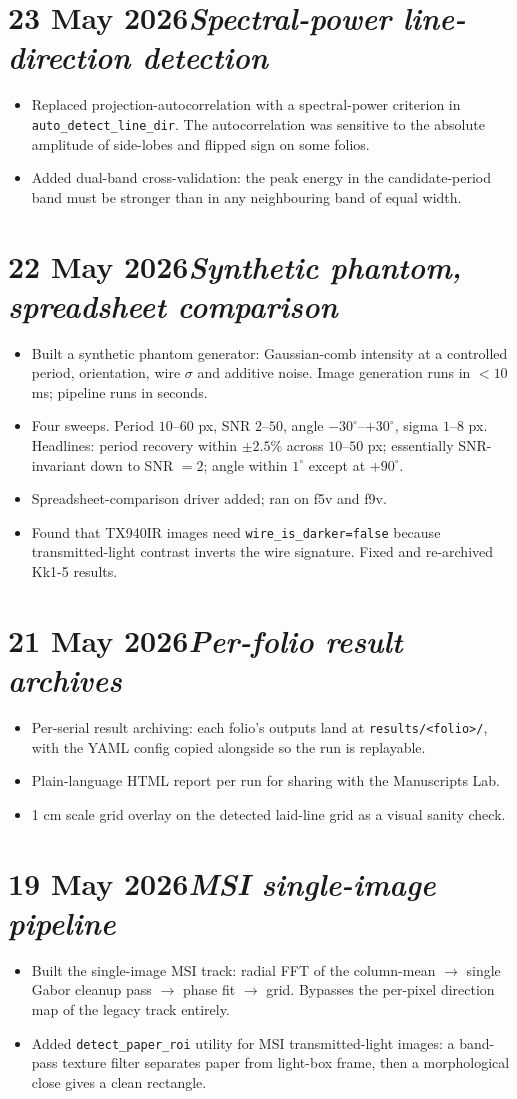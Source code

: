 \documentclass[11pt,a4paper]{article}
\newcommand{\logentry}[2]{\section*{#1\hfill\normalfont\normalsize\textit{#2}}}
\begin{document}
\logentry{23 May 2026}{Spectral-power line-direction detection}
\begin{itemize}
  \item Replaced projection-autocorrelation with a spectral-power criterion in \texttt{auto\_detect\_line\_dir}. The autocorrelation was sensitive to the absolute amplitude of side-lobes and flipped sign on some folios.
  \item Added dual-band cross-validation: the peak energy in the candidate-period band must be stronger than in any neighbouring band of equal width.
\end{itemize}

\logentry{22 May 2026}{Synthetic phantom, spreadsheet comparison}
\begin{itemize}
  \item Built a synthetic phantom generator: Gaussian-comb intensity at a controlled period, orientation, wire $\sigma$ and additive noise. Image generation runs in $<10$ ms; pipeline runs in seconds.
  \item Four sweeps. Period $10$--$60$ px, SNR $2$--$50$, angle $-30^\circ$--$+30^\circ$, sigma $1$--$8$ px. Headlines: period recovery within $\pm 2.5\%$ across $10$--$50$ px; essentially SNR-invariant down to SNR $= 2$; angle within $1^\circ$ except at $+90^\circ$.
  \item Spreadsheet-comparison driver added; ran on f5v and f9v.
  \item Found that TX940IR images need \texttt{wire\_is\_darker=false} because transmitted-light contrast inverts the wire signature. Fixed and re-archived Kk1-5 results.
\end{itemize}

\logentry{21 May 2026}{Per-folio result archives}
\begin{itemize}
  \item Per-serial result archiving: each folio's outputs land at \texttt{results/<folio>/}, with the YAML config copied alongside so the run is replayable.
  \item Plain-language HTML report per run for sharing with the Manuscripts Lab.
  \item 1 cm scale grid overlay on the detected laid-line grid as a visual sanity check.
\end{itemize}

\logentry{19 May 2026}{MSI single-image pipeline}
\begin{itemize}
  \item Built the single-image MSI track: radial FFT of the column-mean $\to$ single Gabor cleanup pass $\to$ phase fit $\to$ grid. Bypasses the per-pixel direction map of the legacy track entirely.
  \item Added \texttt{detect\_paper\_roi} utility for MSI transmitted-light images: a band-pass texture filter separates paper from light-box frame, then a morphological close gives a clean rectangle.
\end{itemize}
\end{document}
